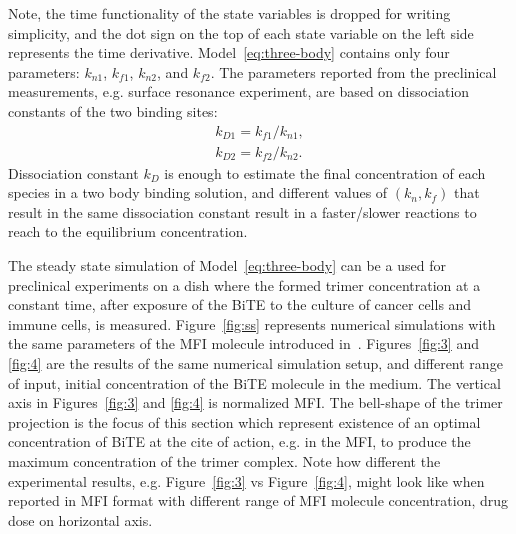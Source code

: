 Note, the time functionality of the state variables is dropped for writing simplicity, and the dot sign on the top of each state variable on the left side represents the time derivative. Model~\ref{eq:three-body} contains only four parameters: $k_{n1}$, $k_{f1}$, $k_{n2}$, and $k_{f2}$. The parameters reported from the preclinical measurements, e.g. surface resonance experiment, are based on dissociation constants of the two binding sites: 
\begin{subequations} \label{eq:kd}
	\begin{align}
		k_{D1}=k_{f1}/k_{n1},\\
		k_{D2}=k_{f2}/k_{n2}.
	\end{align}
\end{subequations}
Dissociation constant $k_D$ is enough to estimate the final concentration of each species in a two body binding solution, and different values of $(k_n, k_f)$ that result in the same dissociation constant result in a faster/slower reactions to reach to the equilibrium concentration. 

The steady state simulation of Model~\eqref{eq:three-body} can be a used for preclinical experiments on a dish where the formed trimer concentration at a constant time, after exposure of the \ac{BiTE} to the culture of cancer cells and immune cells, is measured. Figure~\ref{fig:ss} represents numerical simulations with the same parameters of the \ac{MFI} molecule introduced in~\cite{betts2019translational}. Figures~\ref{fig:3} and \ref{fig:4} are the results of the same numerical simulation setup, and different range of input, initial concentration of the \ac{BiTE} molecule in the medium. The vertical axis in Figures~\ref{fig:3} and \ref{fig:4} is normalized \ac{MFI}. The bell-shape of the trimer projection is the focus of this section which represent existence of an optimal concentration of \ac{BiTE} at the cite of action, e.g. in the \ac{MFI}, to produce the maximum concentration of the trimer complex. Note how different the experimental results, e.g. Figure~\ref{fig:3} vs Figure~\ref{fig:4}, might look like when reported in \ac{MFI} format with different range of \ac{MFI} molecule concentration, drug dose on horizontal axis.  

